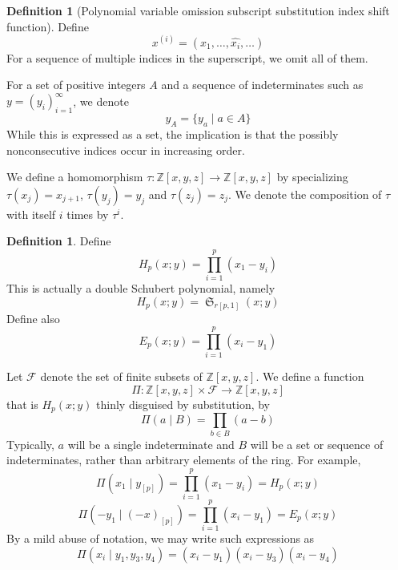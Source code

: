 \documentclass{amsart}
\theoremstyle{definition}
\newtheorem{definition}[lemma]{Definition}
\theoremstyle{remark}
\numberwithin{equation}{subsection}
\DeclareMathOperator{\sch}{\mathfrak{S}}
\newcommand{\smpfu}{\mathsf{\Pi}}
\newcommand{\smpre}[2]{\ensuremath{}\smpfu\left( #1 \mid #2\right)}
\newcommand{\shifthom}{\tau}
\newcommand{\shiftvby}[1]{\shifthom^{#1}}
\begin{document}
	
	
	
	
	
	
	
	
	
	\begin{definition}[Polynomial variable omission subscript substitution index shift function] \label{definition:pv}
		Define
		$$x^{(i)}=(x_1,\ldots,\widehat{x_i},\ldots)$$
		For a sequence of multiple indices in the superscript, we omit all of them. 
		
		For a set of positive integers $A$ and a sequence of indeterminates such as $y = (y_i)_{i=1}^{\infty}$, we denote 
		$$y_A = \{y_a\mid a\in A\}$$
		While this is expressed as a set, the implication is that the possibly nonconsecutive indices occur in increasing order.
		
		We define a homomorphism $\shifthom:\mathbb{Z}[x,y,z]\to\mathbb{Z}[x,y,z]$ by specializing $\shifthom(x_j)=x_{j+1}$, $\shifthom(y_j)=y_j$ and $\shifthom(z_j)=z_j$. We denote the composition of $\shifthom$ with itself $i$ times by $\shiftvby{i}$.
		
	\end{definition}
	
	\begin{definition} \label{definition:hp}
		Define 
		$$H_p(x;y)=\prod_{i=1}^p (x_1-y_i)$$
		This is actually a double Schubert polynomial, namely
		$$H_p(x;y)=\sch_{r[p,1]}(x;y)$$
		Define also
		$$E_p(x;y)=\prod_{i=1}^p (x_i-y_1)$$
		
		Let $\mathcal{F}$ denote the set of finite subsets of $\mathbb{Z}[x,y,z]$. We define a function 
		$$\smpfu:\mathbb{Z}[x,y,z]\times \mathcal{F}\to\mathbb{Z}[x,y,z]$$
		that is $H_p(x;y)$ thinly disguised by substitution, by
		$$\smpre{a}{B} = \prod_{b\in B}(a-b)$$
		Typically, $a$ will be a single indeterminate and $B$ will be a set or sequence of indeterminates, rather than arbitrary elements of the ring. For example,
		$$\smpre{x_1}{y_{[p]}} = \prod_{i=1}^p(x_1-y_i) = H_p(x;y)$$
		$$\smpre{-y_1}{(-x)_{[p]}} = \prod_{i=1}^p(x_i-y_1) = E_p(x;y)$$
		By a mild abuse of notation, we may write such expressions as
		$$\smpre{x_i}{y_1,y_3,y_4} = (x_i-y_1)(x_i-y_3)(x_i-y_4)$$
		
	\end{definition}
	
\end{document}
